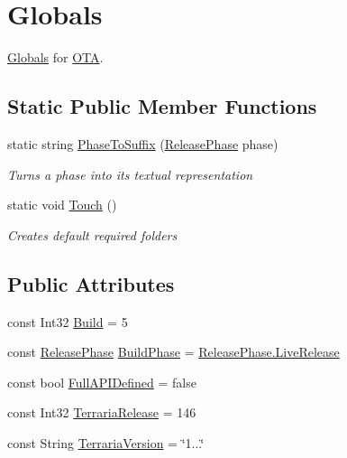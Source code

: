 \hypertarget{classOTA_1_1Globals}{}\section{Globals}
\label{classOTA_1_1Globals}


\hyperlink{classOTA_1_1Globals}{Globals} for \hyperlink{namespaceOTA}{O\+T\+A}.  


\subsection*{Static Public Member Functions}
\begin{DoxyCompactItemize}
\item 
static string \hyperlink{classOTA_1_1Globals_a2701dd03f45751845ad53d77bb1c6f3e}{Phase\+To\+Suffix} (\hyperlink{namespaceOTA_a7e114a895c876876b92a8a256350f287}{Release\+Phase} phase)
\begin{DoxyCompactList}\small\item\em Turns a phase into its textual representation \end{DoxyCompactList}\item 
static void \hyperlink{classOTA_1_1Globals_a10107a2184a9ac1bb257a9865892870e}{Touch} ()
\begin{DoxyCompactList}\small\item\em Creates default required folders \end{DoxyCompactList}\end{DoxyCompactItemize}
\subsection*{Public Attributes}
\begin{DoxyCompactItemize}
\item 
const Int32 \hyperlink{classOTA_1_1Globals_a0e2d534f5f115f0ee44d41e9aa18f07b}{Build} = 5
\item 
const \hyperlink{namespaceOTA_a7e114a895c876876b92a8a256350f287}{Release\+Phase} \hyperlink{classOTA_1_1Globals_a80cc35ea126fb86a6681c8ad2c98b801}{Build\+Phase} = \hyperlink{namespaceOTA_a7e114a895c876876b92a8a256350f287afad48f18ebc2c9841e73117ad3c48eb5}{Release\+Phase.\+Live\+Release}
\item 
const bool \hyperlink{classOTA_1_1Globals_a98d5afccbdbb7c0ead2dda04b4e77b93}{Full\+A\+P\+I\+Defined} = false
\item 
const Int32 \hyperlink{classOTA_1_1Globals_a3d964aaf7b8872b2d5cb2a9ac9b32840}{Terraria\+Release} = 146
\item 
const String \hyperlink{classOTA_1_1Globals_a1ba09245aa3166afea05144efe8a8067}{Terraria\+Version} = \char`\"{}1...\char`\"{}
\end{DoxyCompactItemize}
